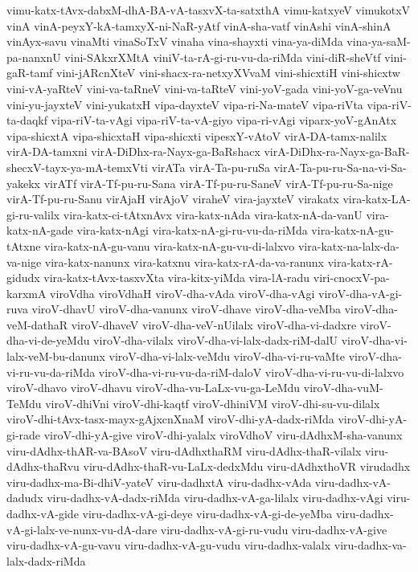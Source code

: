 {vimu-katx-tAvx-dabxM-dhA-BA-vA-tasxvX-ta-satxthA
vimu-katxyeV
vimukotxV
vinA
vinA-peyxY-kA-tamxyX-ni-NaR-yAtf
vinA-sha-vatf
vinAshi
vinA-shinA
vinAyx-savu
vinaMti
vinaSoTxV
vinaha
vina-shayxti
vina-ya-diMda
vina-ya-saM-pa-nanxnU
vini-SAkxrXMtA
viniV-ta-rA-gi-ru-vu-da-riMda
vini-diR-sheVtf
vini-gaR-tamf
vini-jARcnXteV
vini-shacx-ra-netxyXVvaM
vini-shicxtiH
vini-shicxtw
vini-vA-yaRteV
vini-va-taRneV
vini-va-taRteV
vini-yoV-gada
vini-yoV-ga-veVnu
vini-yu-jayxteV
vini-yukatxH
vipa-dayxteV
vipa-ri-Na-mateV
vipa-riVta
vipa-riV-ta-daqkf
vipa-riV-ta-vAgi
vipa-riV-ta-vA-giyo
vipa-ri-vAgi
viparx-yoV-gAnAtx
vipa-shicxtA
vipa-shicxtaH
vipa-shicxti
vipesxY-vAtoV
virA-DA-tamx-nalilx
virA-DA-tamxni
virA-DiDhx-ra-Nayx-ga-BaRshacx
virA-DiDhx-ra-Nayx-ga-BaR-shecxV-tayx-ya-mA-temxVti
virATa
virA-Ta-pu-ruSa
virA-Ta-pu-ru-Sa-na-vi-Sa-yakekx
virATf
virA-Tf-pu-ru-Sana
virA-Tf-pu-ru-SaneV
virA-Tf-pu-ru-Sa-nige
virA-Tf-pu-ru-Sanu
virAjaH
virAjoV
viraheV
vira-jayxteV
virakatx
vira-katx-LA-gi-ru-valilx
vira-katx-ci-tAtxnAvx
vira-katx-nAda
vira-katx-nA-da-vanU
vira-katx-nA-gade
vira-katx-nAgi
vira-katx-nA-gi-ru-vu-da-riMda
vira-katx-nA-gu-tAtxne
vira-katx-nA-gu-vanu
vira-katx-nA-gu-vu-di-lalxvo
vira-katx-na-lalx-da-va-nige
vira-katx-nanunx
vira-katxnu
vira-katx-rA-da-va-ranunx
vira-katx-rA-gidudx
vira-katx-tAvx-tasxvXta
vira-kitx-yiMda
vira-lA-radu
viri-cnocxV-pa-karxmA
viroVdha
viroVdhaH
viroV-dha-vAda
viroV-dha-vAgi
viroV-dha-vA-gi-ruva
viroV-dhavU
viroV-dha-vanunx
viroV-dhave
viroV-dha-veMba
viroV-dha-veM-dathaR
viroV-dhaveV
viroV-dha-veV-nUilalx
viroV-dha-vi-dadxre
viroV-dha-vi-de-yeMdu
viroV-dha-vilalx
viroV-dha-vi-lalx-dadx-riM-dalU
viroV-dha-vi-lalx-veM-bu-danunx
viroV-dha-vi-lalx-veMdu
viroV-dha-vi-ru-vaMte
viroV-dha-vi-ru-vu-da-riMda
viroV-dha-vi-ru-vu-da-riM-daloV
viroV-dha-vi-ru-vu-di-lalxvo
viroV-dhavo
viroV-dhavu
viroV-dha-vu-LaLx-vu-ga-LeMdu
viroV-dha-vuM-TeMdu
viroV-dhiVni
viroV-dhi-kaqtf
viroV-dhiniVM
viroV-dhi-su-vu-dilalx
viroV-dhi-tAvx-tasx-mayx-gAjxcnXnaM
viroV-dhi-yA-dadx-riMda
viroV-dhi-yA-gi-rade
viroV-dhi-yA-give
viroV-dhi-yalalx
viroVdhoV
viru-dAdhxM-sha-vanunx
viru-dAdhx-thAR-va-BAsoV
viru-dAdhxthaRM
viru-dAdhx-thaR-vilalx
viru-dAdhx-thaRvu
viru-dAdhx-thaR-vu-LaLx-dedxMdu
viru-dAdhxthoVR
virudadhx
viru-dadhx-ma-Bi-dhiV-yateV
viru-dadhxtA
viru-dadhx-vAda
viru-dadhx-vA-dadudx
viru-dadhx-vA-dadx-riMda
viru-dadhx-vA-ga-lilalx
viru-dadhx-vAgi
viru-dadhx-vA-gide
viru-dadhx-vA-gi-deye
viru-dadhx-vA-gi-de-yeMba
viru-dadhx-vA-gi-lalx-ve-nunx-vu-dA-dare
viru-dadhx-vA-gi-ru-vudu
viru-dadhx-vA-give
viru-dadhx-vA-gu-vavu
viru-dadhx-vA-gu-vudu
viru-dadhx-valalx
viru-dadhx-va-lalx-dadx-riMda
}
